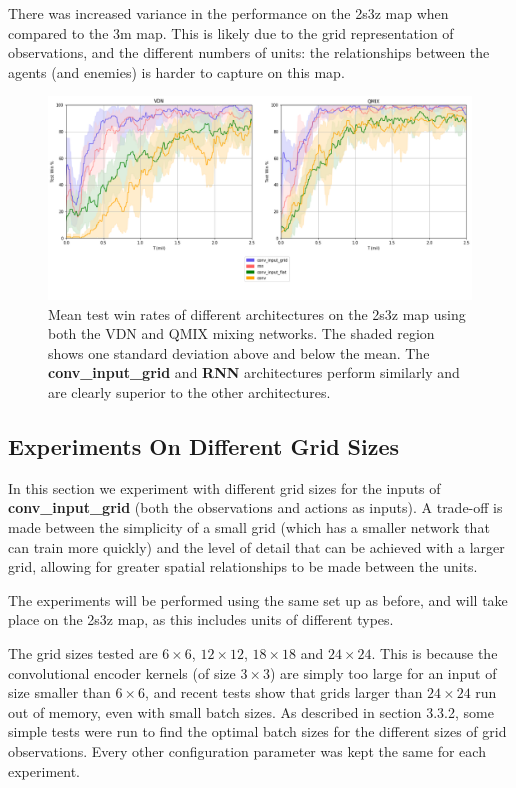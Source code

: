 There was increased variance in the performance on the 2s3z map when compared to the 3m map. This is likely due to the grid representation of observations, and the different numbers of units: the relationships between the agents (and enemies) is harder to capture on this map.

\begin{figure}[h]
    \centering
    \hbox{\hspace{-6.35em}\includegraphics[width=1.34\textwidth]{images/graphs/all2s3z.png}}
    \caption{Mean test win rates of different architectures on the 2s3z map using both the VDN and QMIX mixing networks. The shaded region shows one standard deviation above and below the mean. The \textbf{conv\_input\_grid} and \textbf{RNN} architectures perform similarly and are clearly superior to the other architectures.}
    \label{fig:2s3z_all}
\end{figure}





\subsection{Experiments On Different Grid Sizes}
In this section we experiment with different grid sizes for the inputs of \textbf{conv\_input\_grid} (both the observations and actions as inputs). A trade-off is made between the simplicity of a small grid (which has a smaller network that can train more quickly) and the level of detail that can be achieved with a larger grid, allowing for greater spatial relationships to be made between the units.

The experiments will be performed using the same set up as before, and will take place on the 2s3z map, as this includes units of different types.



The grid sizes tested are $6\times6$, $12\times12$, $18\times18$ and $24\times24$. This is because the convolutional encoder kernels (of size $3\times3$) are simply too large for an input of size smaller than $6\times6$, and recent tests show that grids larger than $24\times24$ run out of memory, even with small batch sizes. As described in section 3.3.2, some simple tests were run to find the optimal batch sizes for the different sizes of grid observations. Every other configuration parameter was kept the same for each experiment.





